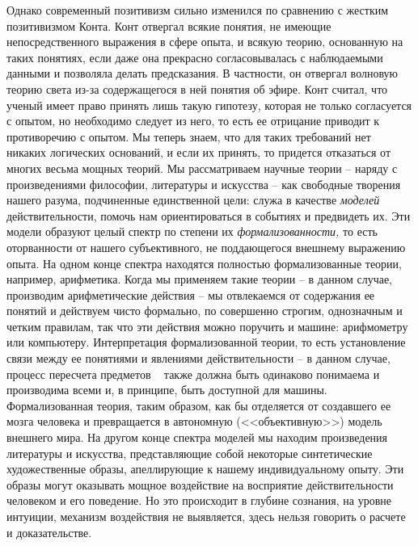 \documentclass{book}
\begin{document}
Однако современный позитивизм сильно изменился по срав­нению с жестким позитивизмом Конта. Конт отвергал всякие понятия, не имеющие непосредственного выражения в сфере опыта, и всякую теорию, основанную на таких понятиях, если даже она прекрасно согласовывалась с наблюдаемыми данными и позволяла делать предсказания. В частности, он отвергал волновую теорию света из-за содержащегося в ней понятия об эфире. Конт считал, что ученый имеет право принять лишь такую гипотезу, которая не только согласуется с опытом, но необходимо следует из него, то есть ее отрицание приводит к противоречию с опытом. Мы теперь знаем, что для таких требований нет никаких логических оснований, и если их принять, то придется отказаться от многих весьма мощных теорий. Мы рассматриваем научные теории -- наряду с произведениями философии, литературы и искусства -- как свободные творения нашего ра­зума, подчиненные единственной цели: служа в качестве \textit{моделей} действительности, помочь нам ориентироваться в событиях и предвидеть их. 
Эти 
модели образуют целый спектр по степени их \textit{формализованности,}  то есть оторванности от нашего субъек­тивного, не поддающегося внешнему выражению опыта. На од­ном конце спектра находятся полностью формализованные теории, например, арифметика. Когда мы применяем такие теории -- в данном случае, производим арифметические действия -- мы отвлекаемся от содержания ее понятий и действуем чисто формально, по совершенно строгим, однозначным и четким правилам, так что эти действия можно поручить и машине: арифмометру или компьютеру. Интерпретация формализованной теории, то есть установление связи между ее понятиями и явлениями действительности -- в данном случае, процесс пересчета предметов ~ также должна быть одинаково понимаема и производима всеми и, в принципе, быть доступной для машины. Формализованная теория, таким образом, как бы отделяется от создавшего ее мозга человека и превращается в автономную (<<объективную>>) модель внешнего мира. На другом конце спектра моделей мы находим произведения 
литературы и 
ис­кусства, представляющие собой некоторые синтетические художественные образы, апеллирующие к нашему индивидуальному опыту. Эти образы могут оказывать мощное воздействие на восприятие действительности человеком и его поведение. Но это происходит в глубине сознания, на уровне интуиции, механизм воздействия не выявляется, здесь нельзя говорить о расчете и доказательстве.
\end{document}
